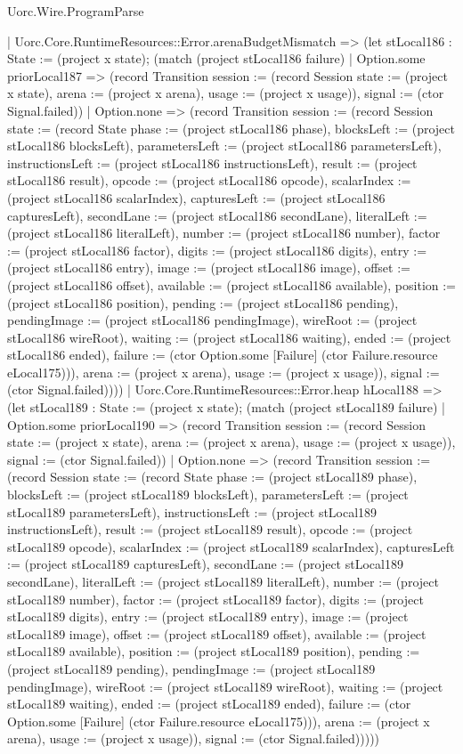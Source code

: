 \begin{lexlean}{Uorc.Wire.ProgramParse}
\begin{semanticmodule}
{      | Uorc.Core.RuntimeResources::Error.arenaBudgetMismatch => (let stLocal186 : State := (project x state); (match (project stLocal186 failure)
        | Option.some priorLocal187 => (record Transition {session := (record Session {state := (project x state), arena := (project x arena), usage := (project x usage)}), signal := (ctor Signal.failed)})
        | Option.none => (record Transition {session := (record Session {state := (record State {phase := (project stLocal186 phase), blocksLeft := (project stLocal186 blocksLeft), parametersLeft := (project stLocal186 parametersLeft), instructionsLeft := (project stLocal186 instructionsLeft), result := (project stLocal186 result), opcode := (project stLocal186 opcode), scalarIndex := (project stLocal186 scalarIndex), capturesLeft := (project stLocal186 capturesLeft), secondLane := (project stLocal186 secondLane), literalLeft := (project stLocal186 literalLeft), number := (project stLocal186 number), factor := (project stLocal186 factor), digits := (project stLocal186 digits), entry := (project stLocal186 entry), image := (project stLocal186 image), offset := (project stLocal186 offset), available := (project stLocal186 available), position := (project stLocal186 position), pending := (project stLocal186 pending), pendingImage := (project stLocal186 pendingImage), wireRoot := (project stLocal186 wireRoot), waiting := (project stLocal186 waiting), ended := (project stLocal186 ended), failure := (ctor Option.some [Failure] (ctor Failure.resource eLocal175))}), arena := (project x arena), usage := (project x usage)}), signal := (ctor Signal.failed)})))
      | Uorc.Core.RuntimeResources::Error.heap hLocal188 => (let stLocal189 : State := (project x state); (match (project stLocal189 failure)
        | Option.some priorLocal190 => (record Transition {session := (record Session {state := (project x state), arena := (project x arena), usage := (project x usage)}), signal := (ctor Signal.failed)})
        | Option.none => (record Transition {session := (record Session {state := (record State {phase := (project stLocal189 phase), blocksLeft := (project stLocal189 blocksLeft), parametersLeft := (project stLocal189 parametersLeft), instructionsLeft := (project stLocal189 instructionsLeft), result := (project stLocal189 result), opcode := (project stLocal189 opcode), scalarIndex := (project stLocal189 scalarIndex), capturesLeft := (project stLocal189 capturesLeft), secondLane := (project stLocal189 secondLane), literalLeft := (project stLocal189 literalLeft), number := (project stLocal189 number), factor := (project stLocal189 factor), digits := (project stLocal189 digits), entry := (project stLocal189 entry), image := (project stLocal189 image), offset := (project stLocal189 offset), available := (project stLocal189 available), position := (project stLocal189 position), pending := (project stLocal189 pending), pendingImage := (project stLocal189 pendingImage), wireRoot := (project stLocal189 wireRoot), waiting := (project stLocal189 waiting), ended := (project stLocal189 ended), failure := (ctor Option.some [Failure] (ctor Failure.resource eLocal175))}), arena := (project x arena), usage := (project x usage)}), signal := (ctor Signal.failed)}))))
}
\end{semanticmodule}
\end{lexlean}
